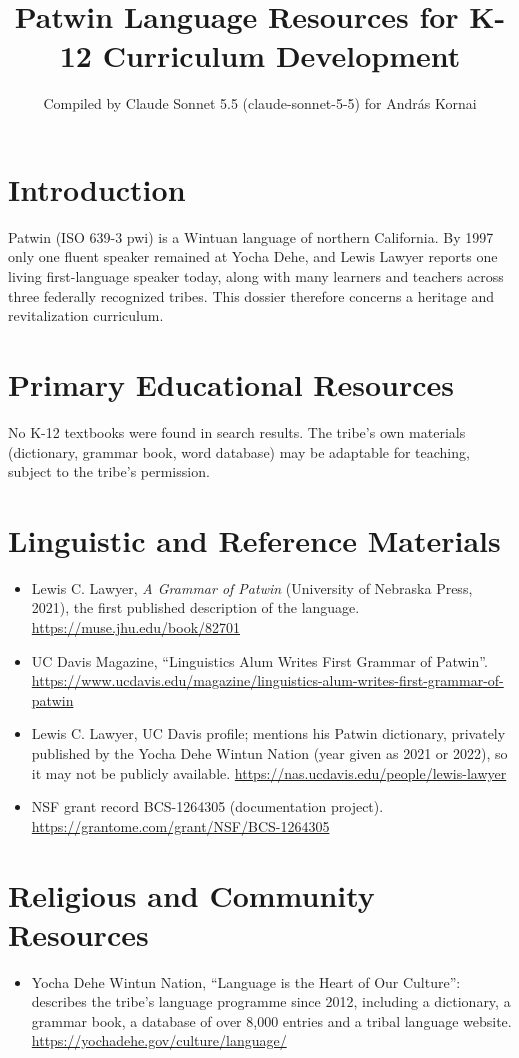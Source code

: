 \documentclass[12pt]{article}
\title{Patwin Language Resources for K-12 Curriculum Development}
\author{Compiled by Claude Sonnet 5.5 (claude-sonnet-5-5) for Andr\'as Kornai}
\date{}
\begin{document}
\maketitle

\section{Introduction}
Patwin (ISO 639-3 pwi) is a Wintuan language of northern California. By 1997 only one fluent speaker remained at Yocha Dehe, and Lewis Lawyer reports one living first-language speaker today, along with many learners and teachers across three federally recognized tribes. This dossier therefore concerns a heritage and revitalization curriculum.

\section{Primary Educational Resources}
No K-12 textbooks were found in search results. The tribe's own materials (dictionary, grammar book, word database) may be adaptable for teaching, subject to the tribe's permission.

\section{Linguistic and Reference Materials}
\begin{itemize}
\item Lewis C. Lawyer, \emph{A Grammar of Patwin} (University of Nebraska Press, 2021), the first published description of the language. \url{https://muse.jhu.edu/book/82701}
\item UC Davis Magazine, ``Linguistics Alum Writes First Grammar of Patwin''. \url{https://www.ucdavis.edu/magazine/linguistics-alum-writes-first-grammar-of-patwin}
\item Lewis C. Lawyer, UC Davis profile; mentions his Patwin dictionary, privately published by the Yocha Dehe Wintun Nation (year given as 2021 or 2022), so it may not be publicly available. \url{https://nas.ucdavis.edu/people/lewis-lawyer}
\item NSF grant record BCS-1264305 (documentation project). \url{https://grantome.com/grant/NSF/BCS-1264305}
\end{itemize}

\section{Religious and Community Resources}
\begin{itemize}
\item Yocha Dehe Wintun Nation, ``Language is the Heart of Our Culture'': describes the tribe's language programme since 2012, including a dictionary, a grammar book, a database of over 8,000 entries and a tribal language website. \url{https://yochadehe.gov/culture/language/}
\end{itemize}
\end{document}

